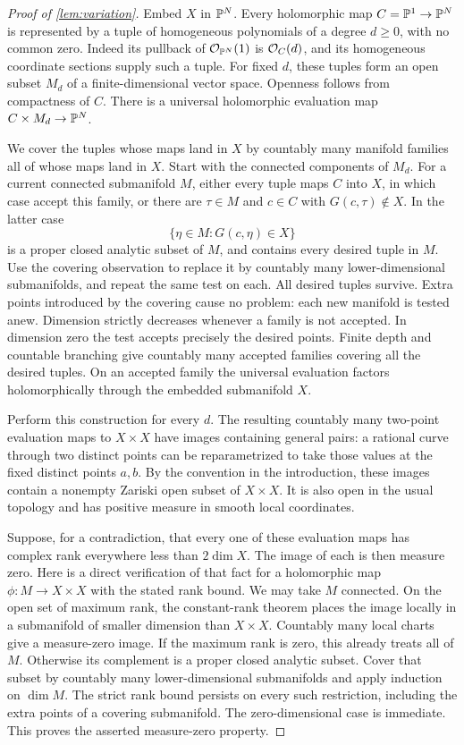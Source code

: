\begin{proof}[Proof of \cref{lem:variation}]
Embed \(X\) in \(\mathbb P^N\). Every holomorphic map
\(C=\mathbb P^1\to\mathbb P^N\) is represented by a tuple of homogeneous
polynomials of a degree \(d\ge0\), with no common zero.
Indeed its pullback of \(\mathcal O_{\mathbb P^N}(1)\) is \(\mathcal O_C(d)\),
and its homogeneous coordinate sections supply such a tuple.
For fixed \(d\), these tuples form an open subset \(M_d\)
of a finite-dimensional vector space. Openness follows
from compactness of \(C\).
There is a universal holomorphic evaluation map
\(C\times M_d\to\mathbb P^N\).

We cover the tuples whose maps land in \(X\) by countably
many manifold families all of whose maps land in \(X\).
Start with the connected components of \(M_d\).
For a current connected submanifold \(M\), either every tuple
maps \(C\) into \(X\), in which case accept this family, or
there are \(\tau\in M\) and \(c\in C\) with
\(G(c,\tau)\notin X\). In the latter case
\[
\{\eta\in M:G(c,\eta)\in X\}
\]
is a proper closed analytic subset of \(M\), and contains
every desired tuple in \(M\).
Use the covering observation to replace it by countably
many lower-dimensional submanifolds, and repeat the same
test on each. All desired tuples survive. Extra points
introduced by the covering cause no problem: each new
manifold is tested anew. Dimension strictly decreases
whenever a family is not accepted. In dimension zero the
test accepts precisely the desired points. Finite depth
and countable branching give countably many accepted
families covering all the desired tuples.
On an accepted family the universal evaluation factors
holomorphically through the embedded submanifold \(X\).

Perform this construction for every \(d\). The resulting
countably many two-point evaluation maps to \(X\times X\)
have images containing general pairs: a rational curve
through two distinct points can be reparametrized to take
those values at the fixed distinct points \(a,b\).
By the convention in the introduction, these images contain a nonempty
Zariski open subset of \(X\times X\). It is also open in the usual
topology and has positive measure in smooth local coordinates.

Suppose, for a contradiction, that every one of these
evaluation maps has complex rank everywhere less than
\(2\dim X\). The image of each is then measure zero.
Here is a direct verification of that fact for a holomorphic
map \(\phi:M\to X\times X\) with the stated rank bound.
We may take \(M\) connected. On the open set of maximum
rank, the constant-rank theorem places the image locally
in a submanifold of smaller dimension than \(X\times X\).
Countably many local charts give a measure-zero image.
If the maximum rank is zero, this already treats all of \(M\).
Otherwise its complement is a proper closed analytic
subset. Cover that subset by countably many
lower-dimensional submanifolds and apply induction on
\(\dim M\). The strict rank bound persists on every such
restriction, including the extra points of a covering
submanifold. The zero-dimensional case is immediate.
This proves the asserted measure-zero property.


\end{proof}
